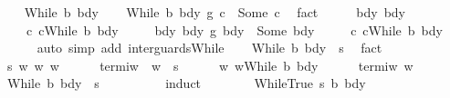 \begin{isabellebody}
\isamarkupfalse%
\isanewline
\ \ \isamarkupfalse%
\ {\isacharparenleft}While\ b\ bdy{}{\isacharparenright}\isanewline
\ \ \isamarkupfalse%
\ {\isachardoublequoteopen}{\isacharparenleft}While\ b\ bdy{}\ {\isasyminter}\isactrlsub g\ c{}{\isacharparenright}\ {\isacharequal}\ Some\ c{\isachardoublequoteclose}\ \isamarkupfalse%
\ fact\isanewline
\ \ \isamarkupfalse%
\ \isamarkupfalse%
\ bdy{}\ bdy\ \isanewline
\ \ \ \ c{}{\isacharcolon}\ {\isachardoublequoteopen}c{}{\isacharequal}While\ b\ bdy{}{\isachardoublequoteclose}\ \isanewline
\ \ \ \ bdy{\isacharcolon}\ {\isachardoublequoteopen}{\isacharparenleft}bdy{}\ {\isasyminter}\isactrlsub g\ bdy{}{\isacharparenright}\ {\isacharequal}\ Some\ bdy{\isachardoublequoteclose}\ \isanewline
\ \ \ \ c{\isacharcolon}\ {\isachardoublequoteopen}c{\isacharequal}While\ b\ bdy{\isachardoublequoteclose}\isanewline
\ \ \ \ \isamarkupfalse%
\ {\isacharparenleft}auto\ simp\ add{\isacharcolon}\ inter{\isacharunderscore}guards{\isacharunderscore}While{\isacharparenright}\isanewline
\ \ \isamarkupfalse%
\ {\isachardoublequoteopen}{\isasymGamma}{\isasymturnstile}While\ b\ bdy{}\ {\isasymdown}\ s{\isachardoublequoteclose}\ \isamarkupfalse%
\ fact\isanewline
\ \ \isamarkupfalse%
\isanewline
\ \ \isacommand{{\isacharbraceleft}}\isamarkupfalse%
\isanewline
\ \ \ \ \isamarkupfalse%
\ s\ w\ w{}\ w{}\isanewline
\ \ \ \ \isamarkupfalse%
\ termi{\isacharunderscore}w{\isacharcolon}\ \ {\isachardoublequoteopen}{\isasymGamma}{\isasymturnstile}w\ {\isasymdown}\ s{\isachardoublequoteclose}\isanewline
\ \ \ \ \isamarkupfalse%
\ w{\isacharcolon}\ {\isachardoublequoteopen}w{\isacharequal}While\ b\ bdy{}{\isachardoublequoteclose}\isanewline
\ \ \ \ \isamarkupfalse%
\ termi{\isacharunderscore}w\ w\ \isanewline
\ \ \ \ \isamarkupfalse%
\ {\isachardoublequoteopen}{\isasymGamma}{\isasymturnstile}While\ b\ bdy\ {\isasymdown}\ s{\isachardoublequoteclose}\ \ \ \ \isanewline
\ \ \ \ \isamarkupfalse%
\ {\isacharparenleft}induct{\isacharparenright}\isanewline
\ \ \ \ \ \ \isamarkupfalse%
\ {\isacharparenleft}WhileTrue\ s\ b{\isacharprime}\ bdy{}{\isacharprime}{\isacharparenright}\isanewline

\end{isabellebody}
